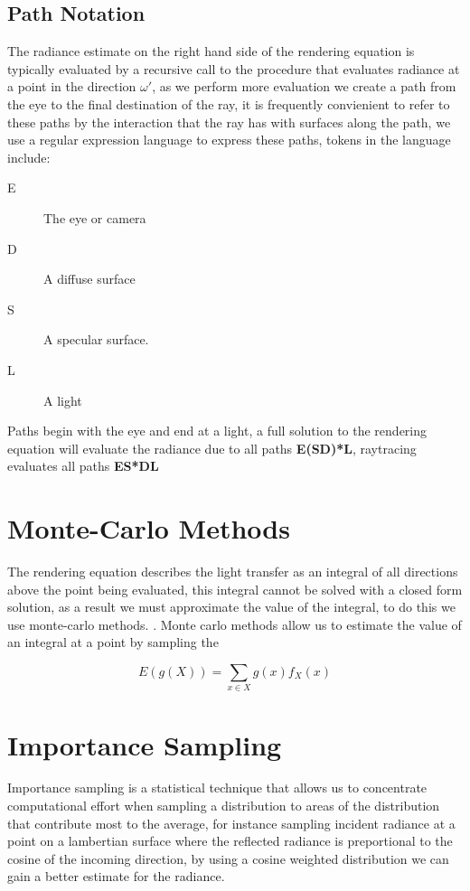 \subsection{Path Notation}
The radiance estimate on the right hand side of the rendering equation is typically evaluated by a recursive call to the
procedure that evaluates radiance at a point in the direction $\omega'$, as we perform more evaluation we create a path
from the eye to the final destination of the ray, it is frequently convienient to refer to these paths by the interaction
that the ray has with surfaces along the path, we use a regular expression language to express these paths, tokens in the
language include:
\begin{description}
\item[E] The eye or camera
\item[D] A diffuse surface
\item[S] A specular surface.
\item[L] A light
\end{description}

Paths begin with the eye and end at a light, a full solution to the rendering equation will evaluate the radiance due
to all paths \textbf{E(S\textbar D)*L}, raytracing evaluates all paths \textbf{ES*DL}

\section{Monte-Carlo Methods}
The rendering equation describes the light transfer as an integral of all directions above the point being evaluated, this
integral cannot be solved with a closed form solution, as a result we must approximate the value of the integral, to do this
we use monte-carlo methods. . Monte carlo methods allow us to estimate the value of an integral at a point
by sampling the 

\begin{equation}
E\left(g\left(X\right)\right) = \sum\limits_{x \in X} g\left(x\right)f_X\left(x\right)
\end{equation}


\section{Importance Sampling}
Importance sampling is a statistical technique that allows us to concentrate computational effort when sampling a distribution
to areas of the distribution that contribute most to the average, for instance sampling incident radiance at a point on a lambertian
surface where the reflected radiance is preportional to the cosine of the incoming direction, by using a cosine weighted distribution
we can gain a better estimate for the radiance.

